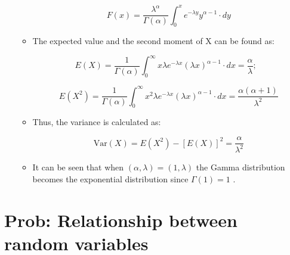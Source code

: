 \documentclass[12pt]{report}
\renewcommand{\_}{\kern-1.5pt\textunderscore\kern-1.5pt}
\begin{document}
\begin{itemize}
\begin{itemize}
 \[ F \left( x \right) =\frac{ \lambda ^{ \alpha }}{ \Gamma  \left(  \alpha  \right) } \int _{0}^{x}e^{- \lambda y}y^{ \alpha -1} \cdot dy \] \par

	\item The expected value and the second moment of X can be found as:\par

 \[ E \left( X \right) =\frac{1}{ \Gamma  \left(  \alpha  \right) } \int _{0}^{\infty}x \lambda e^{- \lambda x} \left(  \lambda x \right) ^{ \alpha -1} \cdot dx=\frac{ \alpha }{ \lambda };~~~ \] \par

 \[ E \left( X^{2} \right) =\frac{1}{ \Gamma  \left(  \alpha  \right) } \int _{0}^{\infty}x^{2} \lambda e^{- \lambda x} \left(  \lambda x \right) ^{ \alpha -1} \cdot dx=\frac{ \alpha  \left(  \alpha +1 \right) }{ \lambda ^{2}} \] \par

	\item Thus, the variance is calculated as:\par

 \[ \mathrm{Var} \left( X \right) =E \left( X^{2} \right) - \left[ E \left( X \right)  \right] ^{2}=\frac{ \alpha }{ \lambda ^{2}} \] \par

	\item It can be seen that when  \(  \left(  \alpha ,  \lambda  \right) = \left( 1,  \lambda  \right)  \)  the Gamma distribution becomes the exponential distribution since  \(  \Gamma  \left( 1 \right) =1 \) .\par


\end{itemize}
\end{itemize}\section*{Prob: Relationship between random variables}
\end{document}

